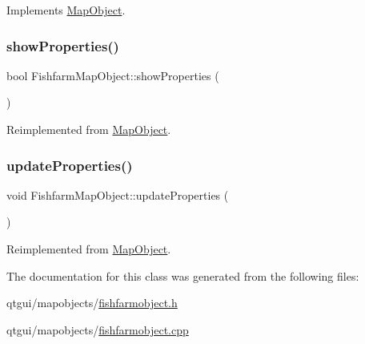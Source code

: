 Implements \mbox{\hyperlink{class_map_object_a82e055e41c862ec8d80d5bfb137b3253}{Map\+Object}}.

\mbox{\label{class_fishfarm_map_object_a88d9da326b469b56a346bed0572c0ab6}} 
\subsubsection{\texorpdfstring{showProperties()}{showProperties()}}
{\footnotesize\ttfamily bool Fishfarm\+Map\+Object\+::show\+Properties (\begin{DoxyParamCaption}{ }\end{DoxyParamCaption})\hspace{0.3cm}{\ttfamily [virtual]}}



Reimplemented from \mbox{\hyperlink{class_map_object_ac58ccb02d5d96d934939b217020c822c}{Map\+Object}}.

\mbox{\label{class_fishfarm_map_object_a53e7378d8f4631b5c3bff739fb355674}} 
\subsubsection{\texorpdfstring{updateProperties()}{updateProperties()}}
{\footnotesize\ttfamily void Fishfarm\+Map\+Object\+::update\+Properties (\begin{DoxyParamCaption}{ }\end{DoxyParamCaption})\hspace{0.3cm}{\ttfamily [virtual]}}



Reimplemented from \mbox{\hyperlink{class_map_object_afa7cd6a4368f4dd077614ac1d983a6c8}{Map\+Object}}.



The documentation for this class was generated from the following files\+:\begin{DoxyCompactItemize}
\item 
qtgui/mapobjects/\mbox{\hyperlink{fishfarmobject_8h}{fishfarmobject.\+h}}\item 
qtgui/mapobjects/\mbox{\hyperlink{fishfarmobject_8cpp}{fishfarmobject.\+cpp}}\end{DoxyCompactItemize}
